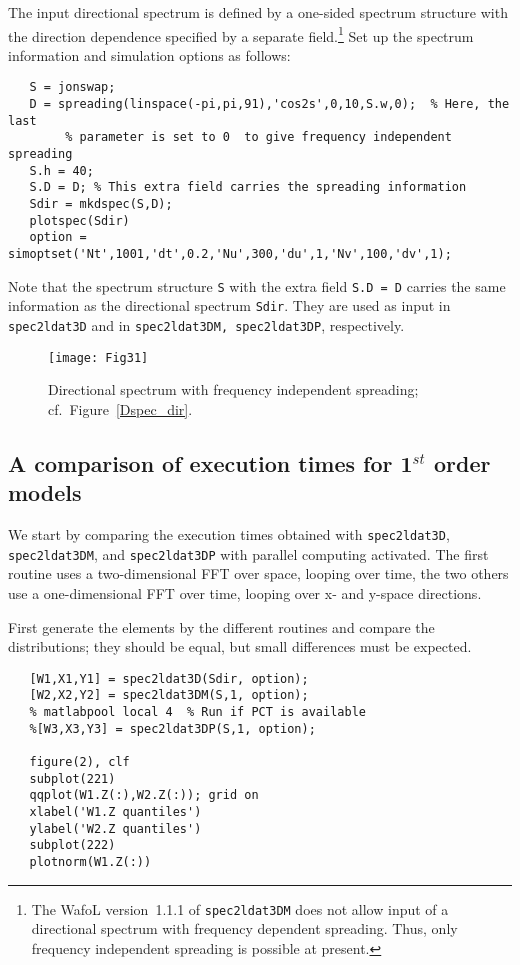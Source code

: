 The input directional spectrum is defined by a one-sided spectrum structure with the direction dependence specified by a separate 
field.\footnote{The {\sc Wafo}L  version~1.1.1 of {\tt spec2ldat3DM} does not allow input of a directional spectrum with frequency dependent spreading. 
Thus, only frequency independent spreading is possible at present.} 
Set up the spectrum information and simulation options as follows: 
{\small\begin{verbatim}
   S = jonswap;
   D = spreading(linspace(-pi,pi,91),'cos2s',0,10,S.w,0);  % Here, the last
        % parameter is set to 0  to give frequency independent spreading
   S.h = 40;
   S.D = D; % This extra field carries the spreading information 
   Sdir = mkdspec(S,D);     
   plotspec(Sdir)
   option = simoptset('Nt',1001,'dt',0.2,'Nu',300,'du',1,'Nv',100,'dv',1);
\end{verbatim}
}
\noindent
Note that the spectrum structure {\tt S} with the extra field {\tt S.D = D} carries the same information as the directional spectrum {\tt Sdir}. They are used as input in 
{\tt spec2ldat3D} and in {\tt spec2ldat3DM, spec2ldat3DP}, respectively. 

\begin{SCfigure}[1][tbh]
\texttt{[image: Fig31]}
\caption{Directional spectrum with frequency independent spreading; cf.\ Figure~\ref{Dspec_dir}.}
\label{Fig31}
\end{SCfigure}
\subsection{A comparison of execution times for 1$^{st}$ order models}
We start by comparing the execution times obtained with  {\tt spec2ldat3D}, {\tt spec2ldat3DM}, and {\tt spec2ldat3DP} with parallel computing activated. The first routine uses a two-dimensional FFT over space, looping over time, the two others use a one-dimensional FFT over time, looping over x- and y-space directions.  

First generate the elements by the different routines and compare the distributions; they should be equal, but small differences must be expected.
{\small \begin{verbatim}
   [W1,X1,Y1] = spec2ldat3D(Sdir, option); 
   [W2,X2,Y2] = spec2ldat3DM(S,1, option); 
   % matlabpool local 4  % Run if PCT is available
   %[W3,X3,Y3] = spec2ldat3DP(S,1, option); 

   figure(2), clf
   subplot(221)
   qqplot(W1.Z(:),W2.Z(:)); grid on
   xlabel('W1.Z quantiles')
   ylabel('W2.Z quantiles')
   subplot(222)
   plotnorm(W1.Z(:))
\end{verbatim}
}


